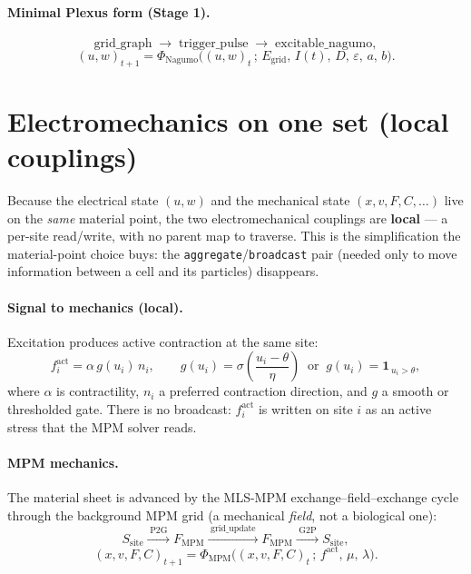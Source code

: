 \documentclass[11pt]{article}
\newcommand{\code}[1]{\texttt{#1}}
\begin{document}
\paragraph{Minimal Plexus form (Stage 1).}
\[
  \mathrm{grid\_graph}
  \;\longrightarrow\;
  \mathrm{trigger\_pulse}
  \;\longrightarrow\;
  \mathrm{excitable\_nagumo},
\]
\[
  (u,w)_{t+1}
    = \Phi_{\mathrm{Nagumo}}\!\Big((u,w)_t\,;\,
        E_{\mathrm{grid}},\, I(t),\, D,\,\varepsilon,\,a,\,b\Big).
\]

\section{Electromechanics on one set (local couplings)}

Because the electrical state $(u,w)$ and the mechanical state
$(x,v,F,C,\dots)$ live on the \emph{same} material point, the two
electromechanical couplings are \textbf{local} --- a per-site read/write, with no
parent map to traverse. This is the simplification the material-point choice buys:
the \code{aggregate}/\code{broadcast} pair (needed only to move information between a
cell and its particles) disappears.

\paragraph{Signal to mechanics (local).}
Excitation produces active contraction at the same site:
\[
  f_i^{\mathrm{act}} = \alpha\,g(u_i)\,n_i,
  \qquad
  g(u_i)=\sigma\!\left(\frac{u_i-\theta}{\eta}\right)
  \;\;\text{or}\;\;
  g(u_i)=\mathbf{1}_{\,u_i>\theta},
\]
where $\alpha$ is contractility, $n_i$ a preferred contraction direction, and $g$ a
smooth or thresholded gate. There is no broadcast: $f_i^{\mathrm{act}}$ is written on
site $i$ as an active stress that the MPM solver reads.

\paragraph{MPM mechanics.}
The material sheet is advanced by the MLS-MPM exchange--field--exchange cycle through
the background MPM grid (a mechanical \emph{field}, not a biological one):
\[
  S_{\mathrm{site}}
  \xrightarrow{\;\mathrm{P2G}\;}
  F_{\mathrm{MPM}}
  \xrightarrow{\;\mathrm{grid\_update}\;}
  F_{\mathrm{MPM}}
  \xrightarrow{\;\mathrm{G2P}\;}
  S_{\mathrm{site}},
\]
\[
  (x,v,F,C)_{t+1}
    = \Phi_{\mathrm{MPM}}\!\Big((x,v,F,C)_t\,;\,
        f^{\mathrm{act}},\,\mu,\,\lambda\Big).
\]
\end{document}
